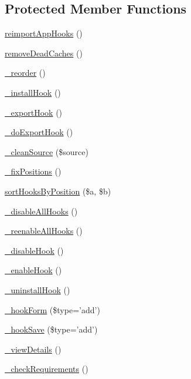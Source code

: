 \subsection*{Protected Member Functions}
\begin{DoxyCompactItemize}
\item 
\hyperlink{classadmin__core__applications__hooks_a8765a7f401e4726f5c18f34d785f9e6b}{reimport\-App\-Hooks} ()
\item 
\hyperlink{classadmin__core__applications__hooks_a60ea8838e7f373e706e5ec8957a7cdb2}{remove\-Dead\-Caches} ()
\item 
\hyperlink{classadmin__core__applications__hooks_af2dc694b733498d55f1d8dd9b27d0e17}{\-\_\-reorder} ()
\item 
\hyperlink{classadmin__core__applications__hooks_a94a8effb16933829dc70d5872b175878}{\-\_\-install\-Hook} ()
\item 
\hyperlink{classadmin__core__applications__hooks_a9043840d92b34669f4cda842509a76cd}{\-\_\-export\-Hook} ()
\item 
\hyperlink{classadmin__core__applications__hooks_a163216bb2f5a0e078618ea0a60965c8c}{\-\_\-do\-Export\-Hook} ()
\item 
\hyperlink{classadmin__core__applications__hooks_aa4bb793f040e6ab64c81ae76bc40eee7}{\-\_\-clean\-Source} (\$source)
\item 
\hyperlink{classadmin__core__applications__hooks_aa647f059d441753813e7302e8dfa0d39}{\-\_\-fix\-Positions} ()
\item 
\hyperlink{classadmin__core__applications__hooks_ad3ed52854deafc7d4361a02b01bd2d89}{sort\-Hooks\-By\-Position} (\$a, \$b)
\item 
\hyperlink{classadmin__core__applications__hooks_aed8d30e4aa44cf68e93f8b34f76c1faf}{\-\_\-disable\-All\-Hooks} ()
\item 
\hyperlink{classadmin__core__applications__hooks_a8f7e5889e67bd1587ec2dbea447ea8b5}{\-\_\-reenable\-All\-Hooks} ()
\item 
\hyperlink{classadmin__core__applications__hooks_a281919feb8f41f479a02a9f10f1c2920}{\-\_\-disable\-Hook} ()
\item 
\hyperlink{classadmin__core__applications__hooks_a819f168550e9fb01633b66450998bcbf}{\-\_\-enable\-Hook} ()
\item 
\hyperlink{classadmin__core__applications__hooks_a4e8756ae05ce34d219817c0b99b1b18d}{\-\_\-uninstall\-Hook} ()
\item 
\hyperlink{classadmin__core__applications__hooks_abb7a108a79092e1258b33373b2b5a36d}{\-\_\-hook\-Form} (\$type='add')
\item 
\hyperlink{classadmin__core__applications__hooks_af7356c63435bb54c47d7356611665300}{\-\_\-hook\-Save} (\$type='add')
\item 
\hyperlink{classadmin__core__applications__hooks_ab9cd25825fbb8a713b04c2e922fd12d6}{\-\_\-view\-Details} ()
\item 
\hyperlink{classadmin__core__applications__hooks_a78c06165ec46fcff956fb555c8916752}{\-\_\-check\-Requirements} ()
\end{DoxyCompactItemize}
